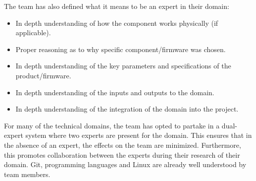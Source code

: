 \documentclass{article}
\begin{document}
The team has also defined what it means to be an expert in their domain: 
\begin{itemize}
    \item In depth understanding of how the component works physically (if applicable). 
    \item Proper reasoning as to why specific component/firmware was chosen.
    \item In depth understanding of the key parameters and specifications of the product/firmware.
    \item In depth understanding of the inputs and outputs to the domain. 
    \item In depth understanding of the integration of the domain into the project. 
\end{itemize}

For many of the technical domains, the team has opted to partake in a dual-expert system where two experts are present for the domain. This ensures that in the absence of an expert, the effects on the team are minimized. Furthermore, this promotes collaboration between the experts during their research of their domain. Git, programming languages and Linux are already well understood by team members. 
\end{document}
